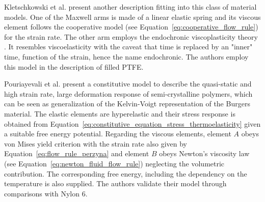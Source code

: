 Kletschkowski et al. \citep{kletschkowskiEndochronicViscoplasticMaterial2002} present another description fitting into this class of material models.
One of the Maxwell arms is made of a linear elastic spring and its viscous element follows the cooperative model (see Equation~\eqref{eq:cooperative_flow_rule}) for the strain rate.
The other arm employs the endochronic viscoplasticity theory \citep{valanisTheoryViscoplasticityYield1970}.
It resembles viscoelasticity with the caveat that time is replaced by an "inner" time, function of the strain, hence the name endochronic.
The authors employ this model in the description of filled PTFE.

Pouriayevali et al. \citep{pouriayevaliConstitutiveDescriptionRatesensitive2013} present a constitutive model to describe the quasi-static and high strain rate, large deformation response of semi-crystalline polymers, which can be seen as generalization of the Kelvin-Voigt representation of the Burgers material.
The elastic elements are hyperelastic and their stress response is obtained from Equation~\eqref{eq:constitutive_equation_stress_thermoelasticity} given a suitable free energy potential.
Regarding the viscous elements, element $A$ obeys von Mises yield criterion with the strain rate also given by Equation~\eqref{eq:flow_rule_perzyna} and element $B$ obeys Newton's viscosity law (see Equation~\eqref{eq:newton_fluid_flow_rule}) neglecting the volumetric contribution.
The corresponding free energy, including the dependency on the temperature is also supplied.
The authors validate their model through comparisons with Nylon 6.

